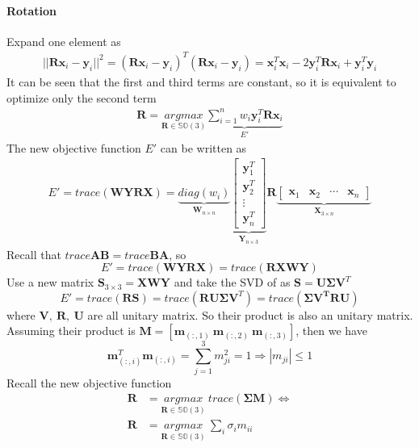\documentclass[a4paper]{report}
\begin{document}
\paragraph{Rotation}
Expand one element as
\begin{align*}
||\mathbf{R}\mathbf{x}_i-\mathbf{y}_i||^2=(\mathbf{R}\mathbf{x}_i-\mathbf{y}_i)^{T}(\mathbf{R}\mathbf{x}_i-\mathbf{y}_i)=\mathbf{x}_i^T\mathbf{x}_i-2\mathbf{y}_i^T\mathbf{Rx}_i+\mathbf{y}_i^T\mathbf{y}_i
\end{align*}
It can be seen that the first and third terms are constant, so it is equivalent to optimize only the second term
\begin{align*}
\mathbf{R}=\underset{\mathbf{R}\in\mathbb{SO}(3)}{argmax} \underbrace{\sum_{i=1}^{n} w_i\mathbf{y}_i^T\mathbf{Rx}_i}_{E'}
\end{align*}
The new objective function $E'$ can be written as
\begin{align*}
E'=trace(\mathbf{WYRX})=\underbrace{diag(w_i)}_{\mathbf{W}_{n\times n}} \underbrace{\left[
\begin{matrix}
\mathbf{y}_1^T \\
\mathbf{y}_2^T \\
\vdots \\
\mathbf{y}_n^T 
\end{matrix}
\right]}_{\mathbf{Y}_{n \times 3}} \mathbf{R} 
\underbrace{\left[
	\begin{matrix}
	\mathbf{x}_1 & \mathbf{x}_2 & \cdots & \mathbf{x}_n 
	\end{matrix}
	\right]}_{\mathbf{X}_{3 \times n}}
\end{align*}
Recall that $trace{\mathbf{AB}}=trace{\mathbf{BA}}$, so 
$$
E'=trace(\mathbf{WYRX})=trace(\mathbf{RXWY})
$$
Use a new matrix $\mathbf{S}_{3 \times 3}=\mathbf{XWY}$ and take the SVD of as $\mathbf{S}=\mathbf{U\Sigma V}^T$
$$
E'=trace(\mathbf{RS})=trace(\mathbf{RU\Sigma V}^T)=trace(\mathbf{\Sigma V^TRU})
$$
where $\mathbf{V},\ \mathbf{R},\ \mathbf{U}$ are all unitary matrix. So their product is also an unitary matrix. Assuming their product is $\mathbf{M}=[\mathbf{m}_{(:,1)}\ \mathbf{m}_{(:,2)}\ \mathbf{m}_{(:,3)}]$, then we have
$$
\mathbf{m}_{(:,i)}^T\mathbf{m}_{(:,i)} = \sum_{j=1}^{3} m_{ji}^2 = 1 \Rightarrow |m_{ji}|\leq 1
$$
Recall the new objective function
\begin{align*}
\mathbf{R}&=\underset{\mathbf{R}\in\mathbb{SO}(3)}{argmax}\ trace(\mathbf{\Sigma M}) \Leftrightarrow \\
\mathbf{R}&=\underset{\mathbf{R}\in\mathbb{SO}(3)}{argmax}\ \sum_{i} \sigma_i m_{ii}
\end{align*}
\end{document}
